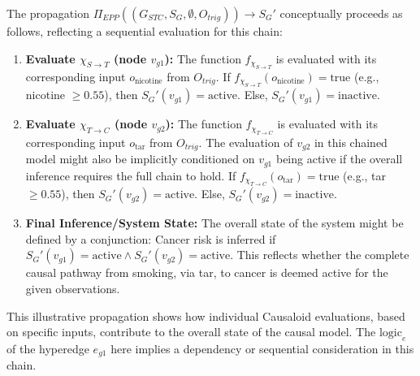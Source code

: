     The propagation \(\Pi_{EPP}((G_{STC}, S_G, \emptyset, O_{trig})) \to S_G'\) conceptually proceeds as follows, reflecting a sequential evaluation for this chain:
    \begin{enumerate}
        \item \textbf{Evaluate \(\chi_{S \to T}\) (node \(v_{g1}\)):}
            The function \(f_{\chi_{S \to T}}\) is evaluated with its corresponding input \(o_{\text{nicotine}}\) from \(O_{trig}\). 
            If \(f_{\chi_{S \to T}}(o_{\text{nicotine}}) = \text{true}\) (e.g., nicotine \(\ge 0.55\)), then \(S_G'(v_{g1}) = \text{active}\). Else, \(S_G'(v_{g1}) = \text{inactive}\).
        \item \textbf{Evaluate \(\chi_{T \to C}\) (node \(v_{g2}\)):}
            The function \(f_{\chi_{T \to C}}\) is evaluated with its corresponding input \(o_{\text{tar}}\) from \(O_{trig}\). The evaluation of \(v_{g2}\) in this chained model might also be implicitly conditioned on \(v_{g1}\) being active if the overall inference requires the full chain to hold.
            If \(f_{\chi_{T \to C}}(o_{\text{tar}}) = \text{true}\) (e.g., tar \(\ge 0.55\)), then \(S_G'(v_{g2}) = \text{active}\). Else, \(S_G'(v_{g2}) = \text{inactive}\).
        \item \textbf{Final Inference/System State:} The overall state of the system might be defined by a conjunction: Cancer risk is inferred if \(S_G'(v_{g1}) = \text{active} \land S_G'(v_{g2}) = \text{active}\). This reflects whether the complete causal pathway from smoking, via tar, to cancer is deemed active for the given observations.
    \end{enumerate}
    This illustrative propagation shows how individual Causaloid evaluations, based on specific inputs, contribute to the overall state of the causal model. The \(\text{logic}_e\) of the hyperedge \(e_{g1}\) here implies a dependency or sequential consideration in this chain.

